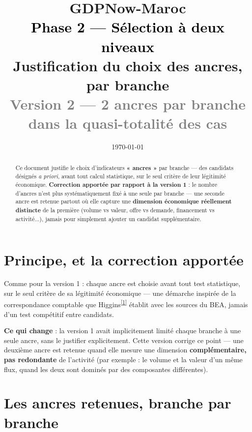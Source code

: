 \documentclass[11pt,a4paper]{article}
\title{\vspace{-1.3cm}\textcolor{bleuprincip}{\Huge\bfseries GDPNow-Maroc}\\[0.3cm]
\textcolor{black}{\Large Phase 2 --- Sélection à deux niveaux}\\[0.15cm]
\textcolor{orancre}{\large Justification du choix des ancres, par branche}\\[0.1cm]
\textcolor{gray}{\normalsize Version 2 --- 2 ancres par branche dans la quasi-totalité des cas}}
\author{}
\date{\today}
\newcommand{\cit}[1]{\textsuperscript{\hyperlink{ref#1}{[#1]}}}
\begin{document}
\maketitle
\thispagestyle{empty}

\begin{abstract}
\noindent Ce document justifie le choix d'indicateurs \textbf{« ancres »} par branche --- des candidats désignés \emph{a priori}, avant tout calcul statistique, sur le seul critère de leur légitimité économique. \textbf{Correction apportée par rapport à la version 1} : le nombre d'ancres n'est plus systématiquement fixé à une seule par branche --- une seconde ancre est retenue partout où elle capture une \textbf{dimension économique réellement distincte} de la première (volume vs valeur, offre vs demande, financement vs activité...), jamais pour simplement ajouter un candidat supplémentaire.
\end{abstract}

\tableofcontents
\vspace{0.3cm}

\section{Principe, et la correction apportée}

\begin{noteboxbleu}
Comme pour la version 1 : chaque ancre est choisie avant tout test statistique, sur le seul critère de sa légitimité économique --- une démarche inspirée de la correspondance comptable que Higgins\cit{1} établit avec les sources du BEA, jamais d'un test compétitif entre candidats.

\textbf{Ce qui change} : la version 1 avait implicitement limité chaque branche à une seule ancre, sans le justifier explicitement. Cette version corrige ce point --- une deuxième ancre est retenue quand elle mesure une dimension \textbf{complémentaire, pas redondante} de l'activité (par exemple : le volume et la valeur d'un même flux, quand les deux sont dominés par des composantes différentes).
\end{noteboxbleu}

\section{Les ancres retenues, branche par branche}
\end{document}
